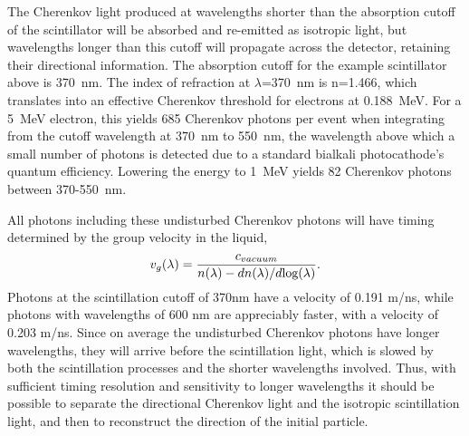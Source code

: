 \documentclass[cits]{JINST}
\begin{document}
The Cherenkov light produced at wavelengths shorter than the
absorption cutoff of the scintillator will be absorbed and re-emitted
as isotropic light, but wavelengths longer than this cutoff will
propagate across the detector, retaining their directional
information. The absorption cutoff for the example scintillator above is 370~nm. The index of refraction at $\lambda$=370~nm is n=1.466, which translates
into an effective Cherenkov threshold for electrons at 0.188~MeV. For a 5~MeV electron, this yields 685 Cherenkov photons per event when integrating from the cutoff wavelength at 370~nm to 550~nm,  the wavelength above which a small number of photons is detected due to a standard bialkali photocathode's quantum efficiency. Lowering the energy to 1~MeV yields 82 Cherenkov photons between 370-550~nm.


All photons including these undisturbed Cherenkov
photons will have timing determined by the group 
velocity\cite{group_velocity_article,pdg_review_2012,tamm1939} in the liquid,
\begin{equation}
\label{eqGroup}
v_{g}(\lambda) = \frac{c_{vacuum}}{n(\lambda) - dn(\lambda)/d\textnormal{log}(\lambda)}.
\end{equation}
Photons at the scintillation cutoff of 370nm have a velocity of 0.191 m/ns, while photons with wavelengths of 600 nm are appreciably faster, with a velocity of 0.203 m/ns. Since on average the undisturbed Cherenkov photons have longer wavelengths, they will arrive before the
scintillation light, which is slowed by both the scintillation
processes and the shorter wavelengths involved. Thus, with sufficient
timing resolution and sensitivity to longer wavelengths it should be
possible to separate the directional Cherenkov light and the isotropic
scintillation light, and then to reconstruct the direction of the
initial particle.
\end{document}
